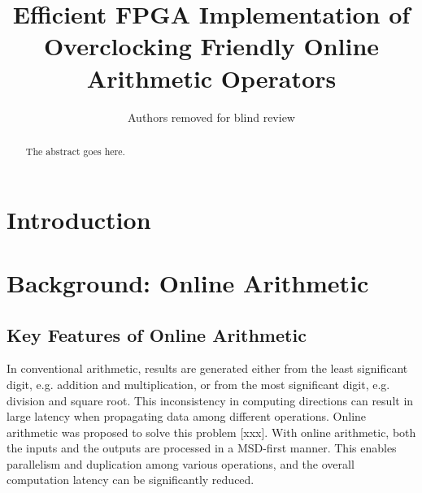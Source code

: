 \documentclass[conference]{IEEEtran}
\begin{document}
\title{Efficient FPGA Implementation of\\ Overclocking Friendly Online Arithmetic Operators}


\author{Authors removed for blind review}

\maketitle


\begin{abstract}
The abstract goes here.
\end{abstract}


%
\IEEEpeerreviewmaketitle



\section{Introduction}

\section{Background: Online Arithmetic}
\subsection{Key Features of Online Arithmetic}
In conventional arithmetic, results are generated either from the least significant digit, e.g. addition and multiplication, or from the most significant digit, e.g. division and square root. This inconsistency in computing directions can result in large latency when propagating data among different operations. Online arithmetic was proposed to solve this problem [xxx]. With online arithmetic, both the inputs and the outputs are processed in a MSD-first manner. This enables parallelism and duplication among various operations, and the overall computation latency can be significantly reduced.
\end{document}
